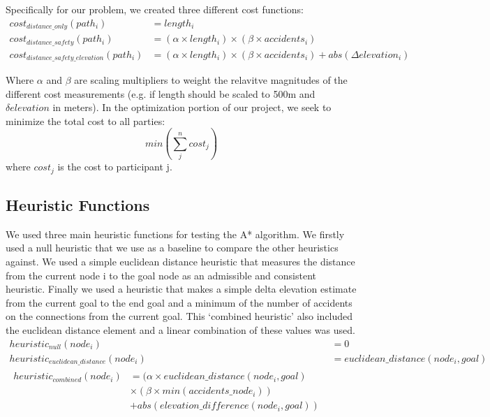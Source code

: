 \documentclass[11pt]{article}
\begin{document}
\noindent Specifically for our problem, we created three different cost functions:
\begin{align}\label{cost_fns}
cost_{distance\_only}(path_i) &= length_i \\
cost_{distance\_safety}(path_i) &= (\alpha \times length_i) \times  (\beta \times accidents_i) \\
cost_{distance\_safety\_elevation}(path_i) &= (\alpha \times length_i) \times  (\beta \times accidents_i) + abs(\Delta elevation_i)
\end{align}


\noindent Where $\alpha$ and $\beta$ are scaling multipliers to weight the relavitve magnitudes of the different cost measurements (e.g. if length should be scaled to 500m and $\delta elevation$ in meters). In the optimization portion of our project, we seek to minimize the total cost to all parties:
\begin{equation}
min(\sum_j^n cost_j)
\end{equation}
where $cost_j$ is the cost to participant j.

\subsection{Heuristic Functions}
We used three main heuristic functions for testing the A* algorithm. We firstly used a null heuristic that we use as a baseline to compare the other heuristics against. We used a simple euclidean distance heuristic that measures the distance from the current node i to the goal node as an admissible and consistent heuristic. Finally we used a heuristic that makes a simple delta elevation estimate from the current goal to the end goal and a minimum of the number of accidents on the connections from the current goal. This `combined heuristic' also included the euclidean distance element and a linear combination of these values was used.
\begin{align}\label{heuristic_fns}
heuristic_{null}(node_i) &= 0 \\
heuristic_{euclidean\_distance}(node_i) &= euclidean\_distance(node_i, goal)\\
\begin{split}
heuristic_{combined}(node_i) &= (\alpha \times euclidean\_distance(node_i, goal) \\ &\times  (\beta \times min(accidents\_node_i)) \\&+ abs(elevation\_difference(node_i, goal))
\end{split}
\end{align}
\end{document}
